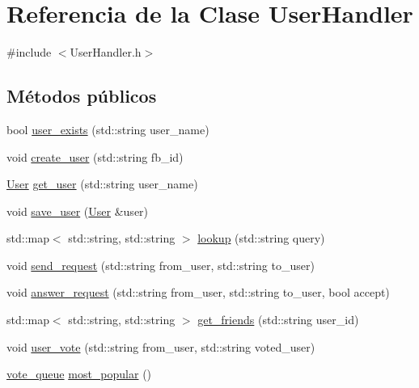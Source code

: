 \hypertarget{classUserHandler}{}\section{Referencia de la Clase User\+Handler}
\label{classUserHandler}


{\ttfamily \#include $<$User\+Handler.\+h$>$}

\subsection*{Métodos públicos}
\begin{DoxyCompactItemize}
\item 
bool \hyperlink{classUserHandler_ad07770b45bee5c2e42059a712fa8dd03}{user\+\_\+exists} (std\+::string user\+\_\+name)
\item 
void \hyperlink{classUserHandler_a24a57bdf7dbc66654b2b87059474af3f}{create\+\_\+user} (std\+::string fb\+\_\+id)
\item 
\hyperlink{classUser}{User} \hyperlink{classUserHandler_a89c1cf91efd6184a41368cdbd59f7908}{get\+\_\+user} (std\+::string user\+\_\+name)
\item 
void \hyperlink{classUserHandler_a54f7a36d48a334c7f5cc176f5f0c00ef}{save\+\_\+user} (\hyperlink{classUser}{User} \&user)
\item 
std\+::map$<$ std\+::string, std\+::string $>$ \hyperlink{classUserHandler_a970aeeb9a856f5413a0759f26d540a93}{lookup} (std\+::string query)
\item 
void \hyperlink{classUserHandler_ad687e0e4c993e40586c829dd18a8bd37}{send\+\_\+request} (std\+::string from\+\_\+user, std\+::string to\+\_\+user)
\item 
void \hyperlink{classUserHandler_aed1b8c59e28db3653dfae14721308c7e}{answer\+\_\+request} (std\+::string from\+\_\+user, std\+::string to\+\_\+user, bool accept)
\item 
std\+::map$<$ std\+::string, std\+::string $>$ \hyperlink{classUserHandler_a37abd677dead8a0c023a760c80e32d88}{get\+\_\+friends} (std\+::string user\+\_\+id)
\item 
void \hyperlink{classUserHandler_a0d5cc1c26560cd14e4f1a9bcf22db18a}{user\+\_\+vote} (std\+::string from\+\_\+user, std\+::string voted\+\_\+user)
\item 
\hyperlink{UserHandler_8h_a8dd774344f3a2ec6200ac8cbdfd3bf1c}{vote\+\_\+queue} \hyperlink{classUserHandler_a4c2cc3fcbff935b81746d2d3a77006b8}{most\+\_\+popular} ()
\end{DoxyCompactItemize}
